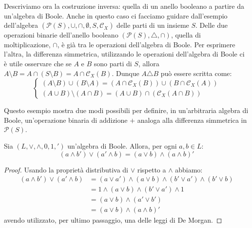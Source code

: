Descriviamo ora la costruzione inversa: quella di un anello booleano a partire da un’algebra di Boole. Anche in questo caso ci facciamo guidare dall'esempio dell'algebra $(\mathcal{P}(S), \cup, \cap, \emptyset, S, \mathcal{C}_{X})$ delle parti di un insieme $S$. Delle due operazioni binarie dell'anello booleano $(\mathcal{P}(S),\triangle,\cap)$, quella di moltiplicazione, $\cap$, è già tra le operazioni dell'algebra di Boole. Per esprimere l'altra, la differenza simmetrica, utilizzando le operazioni dell'algebra di Boole ci è utile osservare che se $A$ e $B$ sono parti di $S$, allora $A \setminus B = A \cap (S \setminus B) = A \cap \mathcal{C}_{X}(B)$. Dunque $A \triangle B$ può essere scritta come:
\begin{displaymath}
	\begin{cases}
		(A \setminus B) \cup (B \setminus A)  = (A \cap \mathcal{C}_{X}(B)) \cup (B \cap \mathcal{C}_{X}(A)) \\
		(A \cup B ) \setminus (A \cap B) = (A \cup B) \cap (\mathcal{C}_{X}(A \cap B))
	\end{cases}
\end{displaymath}

Questo esempio mostra due modi possibili per definire, in un'arbitraria algebra di Boole, un'operazione binaria di addizione $+$ analoga alla differenza simmetrica in $\mathcal{P}(S)$.


\begin{lemmabox}
	Sia $(L,\vee,\wedge,0,1,')$ un'algebra di Boole. Allora, per ogni $a,b \in L$:
	\begin{displaymath}
		(a \wedge b') \vee (a' \wedge b) = (a \vee b) \wedge (a \wedge b) '
	\end{displaymath}
	
\end{lemmabox}
\begin{proof}
	Usando la proprietà distributiva di $\vee$ rispetto a $\wedge$ abbiamo:
	\begin{align*}
		(a \wedge b') \vee (a' \wedge b) &= (a \vee a') \wedge (a \vee b) \wedge (b' \vee a') \wedge (b' \vee b) \\
		&= 1 \wedge (a \vee b) \wedge (b' \vee a') \wedge 1 \\
		&= (a \vee b) \wedge (a' \vee b') \\
		&= (a \vee b) \wedge (a \wedge b)'
	\end{align*}
	avendo utilizzato, per ultimo passaggio, una delle leggi di De Morgan.
\end{proof}


